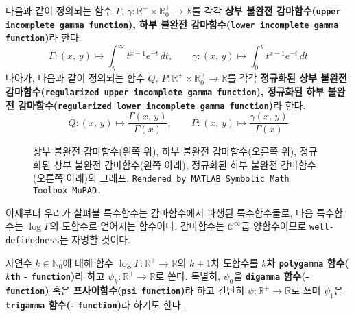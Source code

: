 \begin{definition}
    다음과 같이 정의되는 함수 $\Gamma,\,\gamma:\mathbb{R}^+\times\mathbb{R}^+_0\to\mathbb{R}$를 각각 \textbf{상부 불완전 감마함수(\texttt{upper incomplete gamma function}), 하부 불완전 감마함수(\texttt{lower incomplete gamma function})}라 한다.
    \begin{equation*}
        \Gamma:(x,\,y)\mapsto\int_y^\infty t^{x-1}e^{-t}\,dt,\qquad\gamma:(x,\,y)\mapsto\int_0^yt^{x-1}e^{-t}\,dt
    \end{equation*}
    나아가, 다음과 같이 정의되는 함수 $Q,\,P:\mathbb{R}^+\times\mathbb{R}^+_0\to\mathbb{R}$를 각각 \textbf{정규화된 상부 불완전 감마함수(\texttt{regularized upper incomplete gamma function}), 정규화된 하부 불완전 감마함수(\texttt{regularized lower incomplete gamma function})}라 한다.
    \begin{equation*}
        Q:(x,\,y)\mapsto\frac{\Gamma(x,\,y)}{\Gamma(x)},\qquad P:(x,\,y)\mapsto\frac{\gamma(x,\,y)}{\Gamma(x)}
    \end{equation*}
\end{definition}

\begin{figure}[!ht]
    \centering
\end{figure}

\begin{figure}[!ht]
    \vspace{-7em}
    \centering
    \caption{상부 불완전 감마함수(왼쪽 위), 하부 불완전 감마함수(오른쪽 위), 정규화된 상부 불완전 감마함수(왼쪽 아래), 정규화된 하부 불완전 감마함수(오른쪽 아래)의 그래프. \texttt{Rendered by MATLAB Symbolic Math Toolbox MuPAD.}}
\end{figure}

이제부터 우리가 살펴볼 특수함수는 감마함수에서 파생된 특수함수들로, 다음 특수함수는 $\log\Gamma$의 도함수로 얻어지는 함수이다. 감마함수는 $\mathcal{C}^\infty$급 양함수이므로 \texttt{well-definedness}는 자명할 것이다.

\begin{definition}
    자연수 $k\in\mathbb{N}_0$에 대해 함수 $\log\Gamma:\mathbb{R}^+\to\mathbb{R}$의 $k+1$차 도함수를 \textbf{$k$차 \texttt{polygamma} 함수(\texttt{$k$th} - \texttt{function})}라 하고 $\psi_k:\mathbb{R}^+\to\mathbb{R}$로 쓴다. 특별히, $\psi_0$을 \textbf{\texttt{digamma} 함수(- \texttt{function})} 혹은 \textbf{프사이함수(\texttt{psi function})}라 하고 간단히 $\psi:\mathbb{R}^+\to\mathbb{R}$로 쓰며 $\psi_1$은 \textbf{\texttt{trigamma} 함수(- \texttt{function})}라 하기도 한다.
\end{definition}

